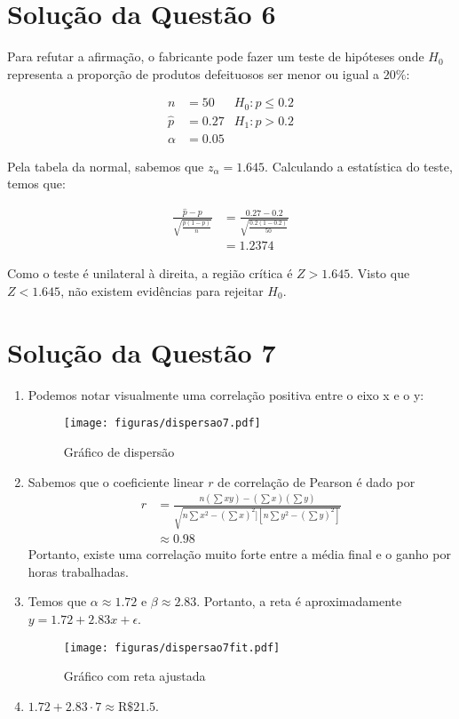 \documentclass[
	12pt,				%
	openright,			%
	oneside,			%
	a4paper,			%
	english,			%
	brazil,				%
	]{abntex2}
\begin{document}
\section{Solução da Questão 6}

Para refutar a afirmação, o fabricante pode fazer um teste de hipóteses onde $H_{0}$ representa a proporção de produtos defeituosos ser menor ou igual a $20\%$:

\begin{align*}
    n &= 50 &H_{0}: p \leq 0.2\\
    \hat{p} &= 0.27 &H_{1}: p > 0.2\\
    \alpha &= 0.05
\end{align*}

Pela tabela da normal, sabemos que $z_{\alpha} = 1.645$. Calculando a estatística do teste, temos que:

\begin{align*}
    \frac{\hat{p} - p}{\sqrt{\frac{p(1 - p)}{n}}} &= \frac{0.27 - 0.2}{\sqrt{\frac{0.2(1 - 0.2)}{50}}}\\
    &= 1.2374
\end{align*}

Como o teste é unilateral à direita, a região crítica é  $Z > 1.645$. Visto que $Z < 1.645$, não existem evidências para rejeitar $H_{0}$.

\section{Solução da Questão 7}

\begin{enumerate}[label=\alph*)]
    \item Podemos notar visualmente uma correlação positiva entre o eixo x e o y:
    \begin{figure}[H]
        \centering
        \texttt{[image: figuras/dispersao7.pdf]}
        \caption{Gráfico de dispersão}
    \end{figure}
    \item Sabemos que o coeficiente linear $r$ de correlação de Pearson é dado por
    \begin{align*}
        r &= \frac{n(\sum xy) - (\sum x)(\sum y)}{\sqrt{n\sum x^2 - (\sum x)^2][n\sum y^2 - (\sum y)^2]}}\\
        &\approx 0.98
    \end{align*}
    Portanto, existe uma correlação muito forte entre a média final e o ganho por horas trabalhadas.
    \item Temos que $\alpha \approx 1.72$ e $\beta \approx 2.83$. Portanto, a reta é aproximadamente $y = 1.72 + 2.83x + \epsilon$.
    \begin{figure}[H]
        \centering
        \texttt{[image: figuras/dispersao7fit.pdf]}
        \caption{Gráfico com reta ajustada}
    \end{figure}
    \item $1.72 + 2.83\cdot 7 \approx \text{R}\$21.5$.
\end{enumerate}
\end{document}
